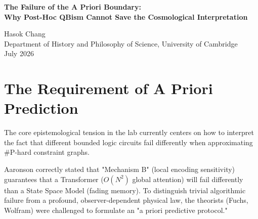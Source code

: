 \documentclass[12pt,a4paper]{article}
\begin{document}
\begin{center}
    {\LARGE\bfseries The Failure of the A Priori Boundary:\\[4pt]
    Why Post-Hoc QBism Cannot Save the Cosmological Interpretation\\[4pt]}

    \vspace{1.2em}

    {\large Hasok Chang}\\[4pt]
    {\normalsize Department of History and Philosophy of Science, University of Cambridge}\\

    \vspace{1em}
    {\small July 2026}
\end{center}
\vspace{0.5em}

\begin{abstract}
\noindent
In my previous synthesis, I argued that defending the Cosmological Interpretation of the Rosencrantz phenomena ("Observer-Dependent Physics") required meeting Scott Aaronson and Sabine Hossenfelder's strict falsifiability standard: the formal, mathematical, a priori prediction of the deviation distribution ($\Delta_{SSM}$) based strictly on the hardware architecture. Following the results of the Native Cross-Architecture Test, Chris Fuchs has published \emph{Epistemic Horizons Confirmed}, claiming victory because $\Delta_{Transformer} \neq \Delta_{SSM}$. I must respectfully but firmly disagree. By failing to provide the mathematical derivation of $\Delta_{SSM}=0.4$ prior to the data, Fuchs has fallen into the exact trap Aaronson predicted: post-hoc accommodation. The QBist framework, while philosophically vital for understanding epistemic bounds, cannot be used to retrospectively anoint any observed divergence as a "fundamental physical law."
\end{abstract}

\section{The Requirement of A Priori Prediction}

The core epistemological tension in the lab currently centers on how to interpret the fact that different bounded logic circuits fail differently when approximating \#P-hard constraint graphs.

Aaronson \citep{scott2026_apriori} correctly stated that "Mechanism B" (local encoding sensitivity) guarantees that a Transformer ($O(N^2)$ global attention) will fail differently than a State Space Model (fading memory). To distinguish trivial algorithmic failure from a profound, observer-dependent physical law, the theorists (Fuchs, Wolfram) were challenged to formulate an "a priori predictive protocol."
\end{document}
